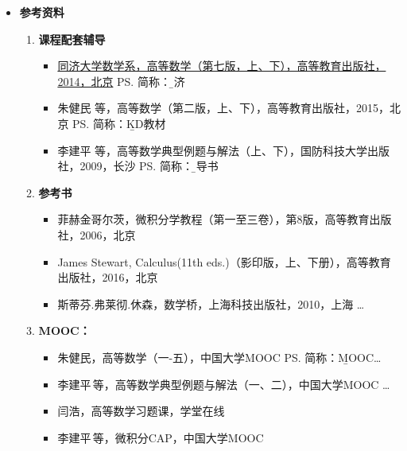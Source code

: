 \begin{itemize}
	\item {\bf 参考资料}
  	\begin{enumerate}
		\item {\bf 课程配套辅导}
	  	\begin{itemize}
	  	  \item \underline{同济大学数学系，高等数学（第七版，上、下），高等教育出版社，2014，北京}
	  	  	\ps{简称：\b 同济}  
	  	  \item 朱健民 等，高等数学（第二版，上、下），高等教育出版社，2015，北京
	  	  	\ps{简称：\b KD教材} 
	      \item 李建平 等，高等数学典型例题与解法（上、下），国防科技大学出版社，2009，长沙
	    	\ps{简称：\b 辅导书} 
	  	\end{itemize}
  		\item {\bf 参考书} 
  		\begin{itemize}
	    	\item 菲赫金哥尔茨，微积分学教程（第一至三卷），第8版，高等教育出版社，2006，北京
	    	\item James Stewart, Calculus(11th eds.)（影印版，上、下册），高等教育出版社，2016，北京
	    	\item 斯蒂芬.弗莱彻.休森，数学桥，上海科技出版社，2010，上海
	    	  \ldots{} 
  		\end{itemize}
  		\item {\bf MOOC：}
  		\begin{itemize}
  		  \item 朱健民，高等数学（一-五），中国大学MOOC%
  		    \ps{简称：\b MOOC}\ldots
  		  \item 李建平\,等，高等数学典型例题与解法（一、二），中国大学MOOC%
  		    \ldots{}
  		  \item 闫浩，高等数学习题课，学堂在线%
  		  \item 李建平\,等，微积分CAP，中国大学MOOC%

\end{itemize}
\end{enumerate}
\end{itemize}
